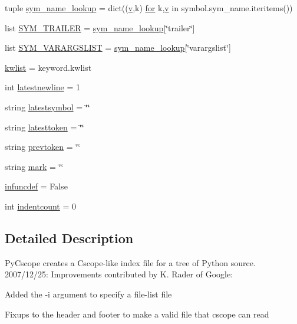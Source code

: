 \begin{DoxyCompactItemize}
$$tuple \hyperlink{namespacepycscope_a178c83c89678929965e9d8dd5f38b22a}{sym\-\_\-name\-\_\-lookup} = dict((\hyperlink{pios__opahrs__proto_8h_a9ff4f5e7fab61b60356262e4f382a906}{v},k) \hyperlink{group___p_i_o_s___t_i_m_ga354d20ebcb9396fb9b160590fcef9cee}{for} k,\hyperlink{pios__opahrs__proto_8h_a9ff4f5e7fab61b60356262e4f382a906}{v} in symbol.\-sym\-\_\-name.\-iteritems())
\item 
list \hyperlink{namespacepycscope_ab4c97a063679d55deb7f785cc59c064f}{S\-Y\-M\-\_\-\-T\-R\-A\-I\-L\-E\-R} = \hyperlink{namespacepycscope_a178c83c89678929965e9d8dd5f38b22a}{sym\-\_\-name\-\_\-lookup}\mbox{[}\char`\"{}trailer\char`\"{}\mbox{]}
\item 
list \hyperlink{namespacepycscope_ae73b4bb791682cb31b75b1b7c2cece1b}{S\-Y\-M\-\_\-\-V\-A\-R\-A\-R\-G\-S\-L\-I\-S\-T} = \hyperlink{namespacepycscope_a178c83c89678929965e9d8dd5f38b22a}{sym\-\_\-name\-\_\-lookup}\mbox{[}\char`\"{}varargslist\char`\"{}\mbox{]}
\item 
\hyperlink{namespacepycscope_ae6ee50ac1c7b31d0ca859b81311cbcee}{kwlist} = keyword.\-kwlist
\item 
int \hyperlink{namespacepycscope_acf630fd0ccc23fcb814b562c780629f5}{latestnewline} = 1
\item 
string \hyperlink{namespacepycscope_a799f69f0ccef70661fe41a0505d074e8}{latestsymbol} = \char`\"{}\char`\"{}
\item 
string \hyperlink{namespacepycscope_ad0f7bbe25c20ebd6bcc1056a3d05287b}{latesttoken} = \char`\"{}\char`\"{}
\item 
string \hyperlink{namespacepycscope_aea25d07f1c7d3231a6a2f9fde8cf1abc}{prevtoken} = \char`\"{}\char`\"{}
\item 
string \hyperlink{namespacepycscope_a912cfb92b6b00c96029f596ac9117aab}{mark} = \char`\"{}\char`\"{}
\item 
\hyperlink{namespacepycscope_aea05d92402ffc86a81655884355d7090}{infuncdef} = False
\item 
int \hyperlink{namespacepycscope_ac1336c917bd5aa8bb13fd24edfe01079}{indentcount} = 0
\end{DoxyCompactItemize}


\subsection{Detailed Description}
Py\-Cscope creates a Cscope-\/like index file for a tree of Python source. 2007/12/25\-: Improvements contributed by K. Rader of Google\-:
\begin{DoxyItemize}
\item Added the {\ttfamily -\/i} argument to specify a file-\/list file
\item Fixups to the header and footer to make a valid file that cscope can read 
\end{DoxyItemize}

